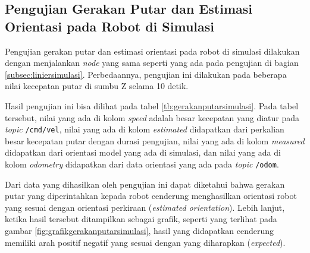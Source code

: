 \subsection{Pengujian Gerakan Putar dan Estimasi Orientasi pada Robot di Simulasi}
\label{subsec:putarsimulasi}

Pengujian gerakan putar dan estimasi orientasi pada robot di simulasi dilakukan dengan menjalankan \emph{node} yang sama seperti yang ada pada pengujian di bagian \ref{subsec:liniersimulasi}.
Perbedaannya, pengujian ini dilakukan pada beberapa nilai kecepatan putar di sumbu Z selama 10 detik.

Hasil pengujian ini bisa dilihat pada tabel \ref{tb:gerakanputarsimulasi}.
Pada tabel tersebut, nilai yang ada di kolom \emph{speed} adalah besar kecepatan yang diatur pada \emph{topic} \lstinline{/cmd/vel},
  nilai yang ada di kolom \emph{estimated} didapatkan dari perkalian besar kecepatan putar dengan durasi pengujian,
  nilai yang ada di kolom \emph{measured} didapatkan dari orientasi model yang ada di simulasi,
  dan nilai yang ada di kolom \emph{odometry} didapatkan dari data orientasi yang ada pada \emph{topic} \lstinline{/odom}.



Dari data yang dihasilkan oleh pengujian ini dapat diketahui bahwa gerakan putar yang diperintahkan kepada robot cenderung menghasilkan orientasi robot yang sesuai dengan orientasi perkiraan (\emph{estimated orientation}).
Lebih lanjut, ketika hasil tersebut ditampilkan sebagai grafik,
  seperti yang terlihat pada gambar \ref{fig:grafikgerakanputarsimulasi},
  hasil yang didapatkan cenderung memiliki arah positif negatif yang sesuai dengan yang diharapkan (\emph{expected}).


